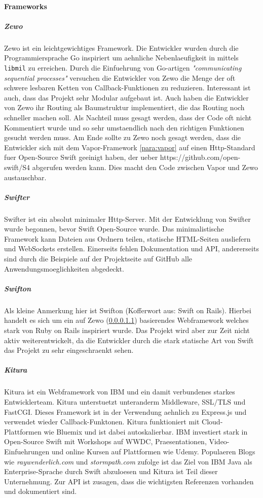\paragraph{Frameworks}
\label{para:frameworks}
\subparagraph{Zewo}
\label{para:zewo}
Zewo ist ein leichtgewichtiges Framework. Die Entwickler wurden durch die Programmiersprache Go inspiriert um aehnliche Nebenlaeufigkeit in mittels \lstinline{libmil}  zu erreichen. Durch die Einfuehrung von Go-artigen \textit{"communicating sequential processes"} versuchen die Entwickler von Zewo die Menge der oft schwere lesbaren Ketten von Callback-Funktionen zu reduzieren. Interessant ist auch, dass das Projekt sehr Modular aufgebaut ist.  Auch haben die Entwickler von Zewo ihr Routing als Baumstruktur implementiert, die das Routing noch schneller machen soll. Als Nachteil muss gesagt werden, dass der Code oft nicht Kommentiert wurde und so sehr umstaendlich nach den richtigen Funktionen gesucht werden muss. Am Ende sollte zu Zewo noch gesagt werden, dass die Entwickler sich mit dem Vapor-Framework \ref{para:vapor} auf einen Http-Standard fuer Open-Source Swift geeinigt haben, der ueber https://github.com/open-swift/S4 abgerufen werden kann\parencite{openswifthttp}. Dies macht den Code zwischen Vapor und Zewo austauschbar. 
\subparagraph{Swifter}
\label{para:swifter}
Swifter ist ein absolut minimaler Http-Server. Mit der Entwicklung von Swifter wurde begonnen, bevor Swift Open-Source wurde. Das minimalistische Framework kann Dateien aus Ordnern teilen, statische HTML-Seiten ausliefern und WebSockets erstellen. Einerseits fehlen Dokumentation und API, andererseits sind durch die Beispiele auf der Projektseite auf GitHub alle Anwendungsmoeglichkeiten abgedeckt. 
\subparagraph{Swifton}
\label{para:swifton}
Als kleine Anmerkung hier ist Swifton (Kofferwort aus: Swift on Rails). Hierbei handelt es sich um ein auf Zewo (\ref{para:zewo}) basierendes Webframework welches stark von Ruby on Rails inspiriert wurde. Das Projekt wird aber zur Zeit nicht aktiv weiterentwickelt, da die Entwickler durch die stark statische Art von Swift das Projekt zu sehr eingeschraenkt sehen\parencite{swifton}.
\subparagraph{Kitura}
\label{para:kitura}
Kitura ist ein Webframework von IBM und ein damit verbundenes starkes Entwicklerteam. Kitura unterstuetzt unteranderm Middleware, SSL/TLS und FastCGI. Dieses Framework ist in der Verwendung aehnlich zu Express.js und verwendet wieder Callback-Funktonen. Kitura funktioniert mit Cloud-Plattformen wie Bluemix und ist dabei autoskalierbar. IBM investiert stark in Open-Source Swift mit Workshops auf WWDC\parencite{WWDC}, Praesentationen, Video-Einfuehrungen\parencite{ibmdemo} und online Kursen auf Plattformen wie Udemy\parencite{udemyswift}. Populaeren Blogs wie \textit{raywenderlich.com} und \textit{stormpath.com}  zufolge ist das Ziel von IBM Java als Enterprise-Sprache durch Swift abzuloesen und Kitura ist Teil dieser Unternehmung.\parencite{rayenterprise}\parencite{stormswiftserver} Zur API ist zusagen, dass die wichtigsten Referenzen vorhanden und dokumentiert sind.

